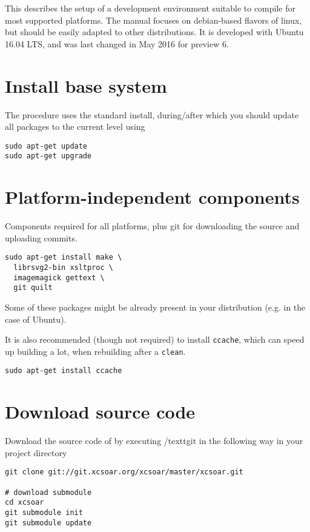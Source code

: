This describes the setup of a development environment suitable to compile \xc for most supported platforms. The manual focuses on debian-based flavors of linux, but should be easily adapted to other distributions. It is developed with Ubuntu 16.04 LTS, and was last changed in May 2016 for  preview  6.

\section{Install base system}\label{sec:developsetup-base}
The procedure uses the standard install, during/after which you should update all packages to the current level using

\begin{verbatim}
sudo apt-get update
sudo apt-get upgrade
\end{verbatim}

\section{Platform-independent components}\label{sec:developsetup-general}

Components required for all platforms, plus git for downloading the source and uploading commits.

\begin{verbatim}
sudo apt-get install make \
  librsvg2-bin xsltproc \
  imagemagick gettext \
  git quilt
\end{verbatim}
Some of these packages might be already present in your distribution (e.g. in the case of Ubuntu).

It is also recommended (though not required) to install \texttt{ccache}, which can speed up building a lot, when rebuilding after a \texttt{clean}.
\begin{verbatim}
sudo apt-get install ccache
\end{verbatim}


\section{Download source code}\label{sec:developsetup-sourcecode}

Download the source code of \xc by executing /textt{git} in the following way in your project directory
\begin{verbatim}
git clone git://git.xcsoar.org/xcsoar/master/xcsoar.git

# download submodule
cd xcsoar
git submodule init
git submodule update
\end{verbatim}

